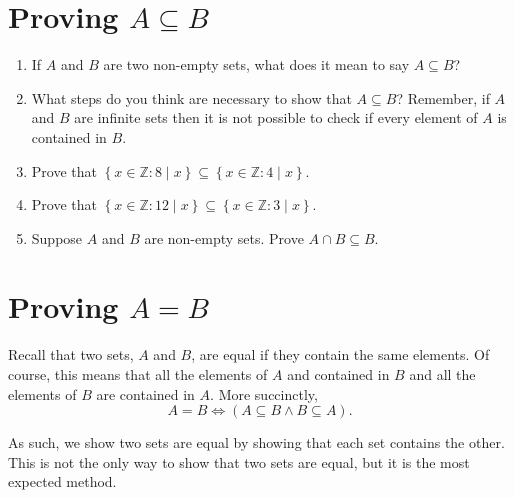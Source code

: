 \documentclass[12 pt]{article}
\newcommand{\Z}{\mathbb{Z}}
\newcommand{\set}[1]{\left\{#1\right\}}
\renewcommand{\subset}{\subseteq}
\newcommand{\divides}{\! \mid \!}
\theoremstyle{definition}
\theoremstyle{plain}
\theoremstyle{mytheorem}
\theoremstyle{myexample}
\theoremstyle{mydefinition}
\begin{document}
\section{Proving $A \subset B$}

\begin{enumerate}[resume]
\item If $A$ and $B$ are two non-empty sets, what does it mean to say $A \subset B$?  

\vspace{1in}

\item What steps do you think are necessary to show that $A \subset B$?  Remember, if $A$ and $B$ are infinite sets then it is not possible to check if every element of $A$ is contained in $B$.

\vspace{3in}

\item Prove that $\set{x \in \Z : 8 \divides x} \subset \set{x \in \Z : 4 \divides x}$.

\vspace{4in}

\item Prove that $\set{x \in \Z : 12 \divides x} \subset \set{x \in \Z : 3 \divides x}$.

\vspace{3in}

\item Suppose $A$ and $B$ are non-empty sets.  Prove $A \cap B \subset B$.

\vspace{3in}
\end{enumerate}

\section{Proving $A = B$}
Recall that two sets, $A$ and $B$, are equal if they contain the same elements.  Of course, this means that all the elements of $A$ and contained in $B$ and all the elements of $B$ are contained in $A$.  More succinctly,
\[A = B \Leftrightarrow (A \subset B \wedge B \subset A).\]

As such, we show two sets are equal by showing that each set contains the other.  This is not the only way to show that two sets are equal, but it is the most expected method.
\end{document}
